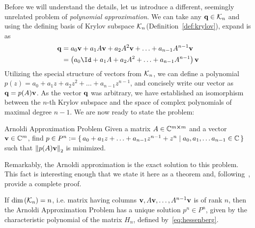 Before we will understand the details, let us introduce a different, seemingly unrelated problem of 
\textit{polynomial approximation}. We can take any \(\vectorbold{q} \in \K{n}\) and using the 
defining basis of Krylov subspace \(\mathcal{K}_{n}\)(Definition~\ref{def:krylov}), expand is as
\begin{align*}
	\vectorbold{q} &= a_0 \vectorbold{v} + a_1 A \vectorbold{v} + a_2 A^2 \vectorbold{v} + \ldots + a_{n-1} A^{n-1} \vectorbold{v} \nonumber \\
				   &= \left(a_0\Id + a_1 A + a_2 A^2 + \ldots + a_{n-1} A^{n-1}\right) \vectorbold{v}
\end{align*}
Utilizing the special structure of vectors from \(\mathcal{K}_{n}\), we can define a polynomial \(p(z) = a_0
+ a_1 z + a_2 z^2 + \ldots + a_{n-1}z^{n-1}\), and concisely write our vector as \(\vectorbold{q} = p(A)\vectorbold{v}\).
As the vector \(\vectorbold{q}\) was arbitrary, we have established an isomorphism between the \(n\)-th Krylov
subspace and the space of complex polynomials of maximal degree \(n-1\). We are now ready to state the problem:
\vspace{-0.3cm}
\begin{titled-frame}{Arnoldi Approximation Problem}
	\centering
Given a matrix \(A\in\mathbb{C}^{m\cross m}\) and a vector \(\vectorbold{v}\in \CC^m\), find  
	\( p \in P^n := \{\, a_0 + a_1 z + \ldots + a_{n-1} z^{n-1} + z^n \mid a_0,a_1,\ldots a_{n-1}\in \mathbb{C} \,\} \)\\
	such that \(\norm{p(A)\vectorbold{v}}_2\) is minimized.
\end{titled-frame}

Remarkably, the Arnoldi approximation is the exact solution to this problem. This fact is interesting enough that
we state it here as a theorem and, following~\textcite{Trefethen1997}, provide a complete proof.

\begin{theorem}
	If \(\textrm{dim}\left(\mathcal{K}_{n}\right) = n\), i.e. matrix having columns \(\vectorbold{v},A\vectorbold{v},\ldots, A^{n-1}
	\vectorbold{v}\) is of rank \(n\), then the Arnoldi Approximation Problem has a unique solution \(p^n\in P^n\),
	given by the characteristic polynomial of the matrix \(H_n\), defined by~\eqref{eq:hessenberg}.
	\label{theorem:arnoldi_approximation}
\end{theorem}

